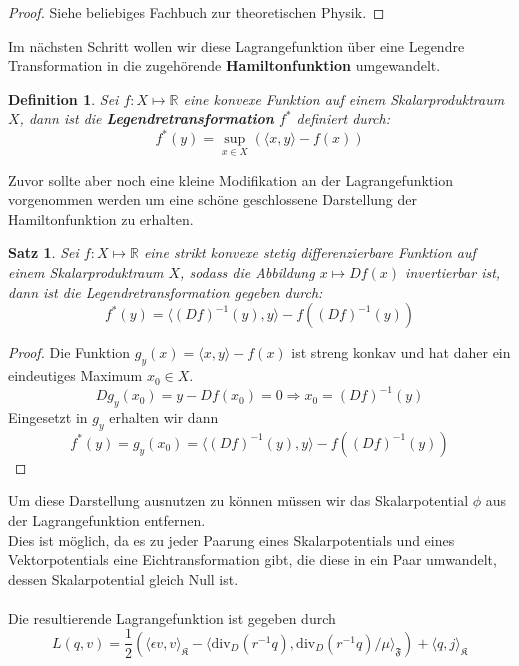 \documentclass[11pt,a4paper,leqno]{report}
\newtheorem{proposition}{Satz}[chapter]
\newtheorem{definition}[theorem]{Definition}
\numberwithin{equation}{chapter}
\begin{document}
\begin{proof}
Siehe beliebiges Fachbuch zur theoretischen Physik.
\end{proof}
\noindent
Im n\"achsten Schritt wollen wir diese Lagrangefunktion \"uber eine Legendre Transformation in die zugeh\"orende \textbf{Hamiltonfunktion} umgewandelt.
\begin{definition}
	Sei $f:X\mapsto\mathbb{R}$ eine konvexe Funktion auf einem Skalarproduktraum $X$, dann ist die \textbf{Legendretransformation} $f^*$ definiert durch:
	\begin{equation}
		f^*(y) = \sup_{x\in X}(\langle x, y\rangle-f(x))
	\end{equation}
\end{definition}
\noindent
Zuvor sollte aber noch eine kleine Modifikation an der Lagrangefunktion vorgenommen werden um eine sch\"one geschlossene Darstellung der Hamiltonfunktion zu erhalten.
\begin{proposition}
	Sei $f:X\mapsto\mathbb{R}$ eine strikt konvexe stetig differenzierbare Funktion auf einem Skalarproduktraum $X$, sodass die Abbildung $x\mapsto Df(x)$ invertierbar ist, dann ist die Legendretransformation gegeben durch:
	\begin{equation}
		f^*(y) = \langle (Df)^{-1}(y), y\rangle-f((Df)^{-1}(y))
	\end{equation}
\end{proposition}
\begin{proof}
Die Funktion $g_y(x)=\langle x, y\rangle-f(x)$ ist streng konkav und hat daher ein eindeutiges Maximum $x_0\in X$.
\begin{equation*}
	Dg_y(x_0) = y - Df(x_0)=0\Rightarrow x_0 = (Df)^{-1}(y)
\end{equation*}
Eingesetzt in $g_y$ erhalten wir dann
\begin{equation*}
	f^*(y)=g_y(x_0) = \langle (Df)^{-1}(y), y\rangle-f((Df)^{-1}(y))
\end{equation*}
\end{proof}
\noindent
Um diese Darstellung ausnutzen zu k\"onnen m\"ussen wir das Skalarpotential $\phi$ aus der Lagrangefunktion entfernen.\\
Dies ist m\"oglich, da es zu jeder Paarung eines Skalarpotentials und eines Vektorpotentials eine Eichtransformation gibt, die diese in ein Paar umwandelt, dessen Skalarpotential gleich Null ist.\\
\\
Die resultierende Lagrangefunktion ist gegeben durch 
\begin{equation}
	L(q, v) =\frac{1}{2}(\langle \epsilon v, v\rangle_\mathfrak{K} - \langle\text{div}_D(r^{-1}q), \text{div}_D(r^{-1}q)/\mu\rangle_\mathfrak{F}) + \langle q, j\rangle_\mathfrak{K}
\end{equation}
\end{document}
